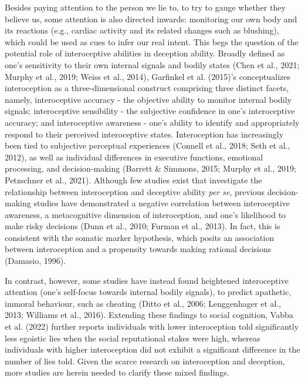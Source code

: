 \documentclass[
  man,floatsintext]{apa6}
\begin{document}
Besides paying attention to the person we lie to, to try to gauge whether they believe us, some attention is also directed inwards: monitoring our own body and its reactions (e.g., cardiac activity and its related changes such as blushing), which could be used as cues to infer our real intent. This begs the question of the potential role of interoceptive abilities in deception ability. Broadly defined as one's sensitivity to their own internal signals and bodily states (Chen et al., 2021; Murphy et al., 2019; Weiss et al., 2014), Garfinkel et al. (2015)'s conceptualizes interoception as a three-dimensional construct comprising three distinct facets, namely, interoceptive accuracy - the objective ability to monitor internal bodily signals; interoceptive sensibility - the subjective confidence in one's interoceptive accuracy; and interoceptive awareness - one's ability to identify and appropriately respond to their perceived interoceptive states. Interoception has increasingly been tied to subjective perceptual experiences (Connell et al., 2018; Seth et al., 2012), as well as individual differences in executive functions, emotional processing, and decision-making (Barrett \& Simmons, 2015; Murphy et al., 2019; Petzschner et al., 2021). Although few studies exist that investigate the relationship between interoception and deceptive ability \emph{per se}, previous decision-making studies have demonstrated a negative correlation between interoceptive awareness, a metacognitive dimension of interoception, and one's likelihood to make risky decisions (Dunn et al., 2010; Furman et al., 2013). In fact, this is consistent with the somatic marker hypothesis, which posits an association between interoception and a propensity towards making rational decisions (Damasio, 1996).

In contrast, however, some studies have instead found heightened interoceptive attention (one's self-focus towards internal bodily signals), to predict apathetic, immoral behaviour, such as cheating (Ditto et al., 2006; Lenggenhager et al., 2013; Williams et al., 2016). Extending these findings to social cognition, Vabba et al. (2022) further reports individuals with lower interoception told significantly less egoistic lies when the social reputational stakes were high, whereas individuals with higher interoception did not exhibit a significant difference in the number of lies told. Given the scarce research on interoception and deception, more studies are herein needed to clarify these mixed findings.
\end{document}
